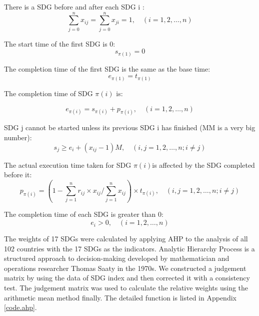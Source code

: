 \documentclass[10pt]{mcmthesis}
\begin{document}
There is a SDG before and after each SDG i :
\begin{equation}
    	\sum_{j=0}^nx_{ij}=\sum_{j=0}^nx_{ji}=1, \quad(i=1,2, \ldots, n)
\end{equation}

The start time of the first SDG is 0:
\begin{equation}
s_{\pi(1)}=0
\end{equation}

The completion time of the first SDG is the same as the base time:
\begin{equation}
e_{\pi(1)}=t_{\pi(1)}
\end{equation}

The completion time of SDG $\pi(i)$  is:

\begin{equation}
e_{\pi(i)}=s_{\pi(i)}+p_{\pi(i)}, \quad(i=1,2, \ldots, n)
\end{equation}

SDG j cannot be started unless its previous SDG i has finished (MM is a very big number):
\begin{equation}
s_j \geq e_i+(x_{ij}-1)M, \quad(i, j=1,2, \ldots, n ; i \neq j)
\end{equation}

The actual execution time taken for SDG $\pi(i) $is affected by the SDG completed before it:
\begin{equation}
p_{\pi(i)}=(1-\sum_{j=1}^n r_{i j} \times x_{i j}/ \sum_{j=1}^n x_{i j}) \times t_{\pi(i)}, \quad(i, j=1,2, \ldots, n ; i \neq j)
\end{equation}

The completion time of each SDG is greater than 0:
\begin{equation}
e_i>0, \quad(i=1,2, \ldots, n)
\end{equation}




The weights of 17 SDGs were calculated by applying AHP to the analysis of all 102 countries with the 17 SDGs as the indicators.
Analytic Hierarchy Process\cite{torfi2010fuzzy} is a structured approach to decision-making developed by mathematician and operations researcher Thomas Saaty in the 1970s. We constructed a judgement matrix by using the data of SDG index and then corrected it with a consistency test. The judgement matrix was used to calculate the relative weights using the arithmetic mean method finally. The detailed function is listed in Appendix \ref{code.ahp}.
\end{document}
